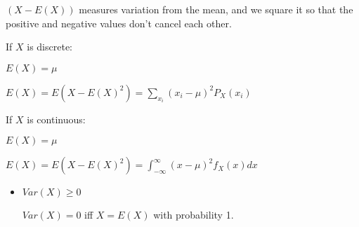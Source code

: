 \documentclass{article}
\begin{document}
$(X- E(X))$ measures variation from the mean, and we square it so that the positive and negative values don't cancel each other.

If $X$ is discrete:

$E(X)= \mu$

$E(X)= E(X-E(X)^2) = \sum_{x_i} (x_i - \mu )^2 P_X (x_i)$

If $X$ is continuous:

$E(X)= \mu$

$E(X)= E(X-E(X)^2)= \int_{-\infty}^{\infty}(x- \mu)^2 f_X(x)dx$

\begin{itemize}
    \item $ Var(X) \geq 0$

    $Var(X)=0$ iff $X=E(X)$ with probability 1.
\end{itemize}
\end{document}
